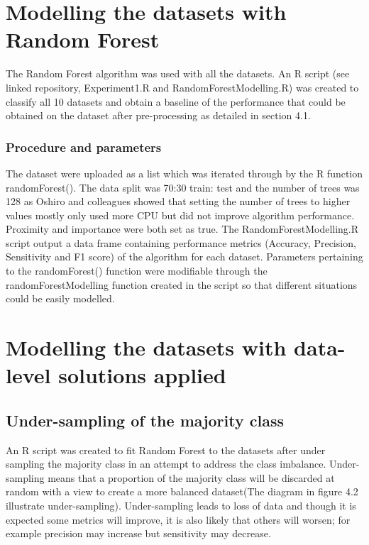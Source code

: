 \section{Modelling the datasets with Random Forest}
The Random Forest algorithm was used with all the datasets. 
An R script (see linked repository, Experiment1.R and RandomForestModelling.R) was created to classify all 10 datasets and obtain a baseline of the performance that could be obtained on the dataset after pre-processing as detailed in section 4.1.\newline
\subsubsection{Procedure and parameters}
The dataset were uploaded as a list which was iterated through by the R function randomForest(). 
The data split was 70:30 train: test and the number of trees was 128 as Oshiro and colleagues showed that setting the number of trees to higher values mostly only used more CPU but did not improve algorithm performance\citep{MayumiOshiro:ve}. Proximity and importance were both set as true.\newline
The RandomForestModelling.R script output  a data frame containing performance metrics (Accuracy, Precision, Sensitivity and F1 score) of the algorithm for each dataset.\newline
Parameters pertaining to the randomForest() function were modifiable through the randomForestModelling function created in the script so that different situations could be easily modelled.\newline


\section{Modelling the datasets with data-level solutions applied}
\subsection{Under-sampling of the majority class}
An R script was created to fit Random Forest to the datasets after under sampling the majority class in an attempt to address the class imbalance.\newline
Under-sampling means that a proportion of the majority class will be discarded at random with a view to create a more balanced dataset(The diagram in figure 4.2 illustrate under-sampling).\newline
Under-sampling leads to loss of data and though it is expected some metrics will improve, it is also likely that others will worsen; for example precision may increase but sensitivity may decrease.\newline

